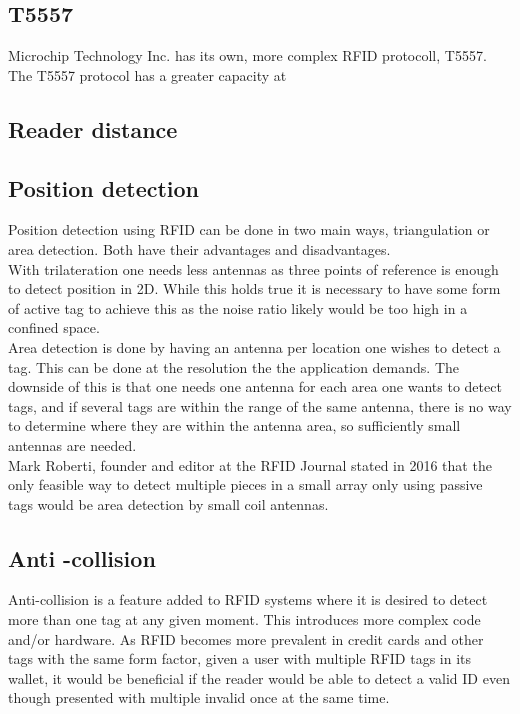 \subsection{T5557}
Microchip Technology Inc. has its own, more complex RFID protocoll, T5557. \cite{T5557priority} The T5557 protocol has a greater capacity at 

\subsection{Reader distance}
\cite{microID125}
\subsection{Position detection}
Position detection using RFID can be done in two main ways, triangulation \cite{triangulationbritannica_2011} or area detection. \cite{cho2014rfid} Both have their advantages and disadvantages.\\

With trilateration one needs less antennas as three points of reference is enough to detect position in 2D. While this holds true it is necessary to have some form of active tag to achieve this as the noise ratio likely would be too high in a confined space.\\

Area detection is done by having an antenna per location one wishes to detect a tag. This can be done at the resolution the the application demands. The downside of this is that one needs one antenna for each area one wants to detect tags, and if several tags are within the range of the same antenna, there is no way to determine where they are within the antenna area, so sufficiently small antennas are needed.\\

Mark Roberti, founder and editor at the RFID Journal stated in 2016 that the only feasible way to detect multiple pieces in a small array only using passive tags would be area detection by small coil antennas. \cite{roberti_francois}


\subsection{Anti -collision}

Anti-collision is a feature added to RFID systems where it is desired to detect more than one tag at any given moment. This introduces more complex code and/or hardware. As RFID becomes more prevalent in credit cards and other tags with the same form factor, given a user with multiple RFID tags in its wallet, it would be beneficial if the reader would be able to detect a valid ID even though presented with multiple invalid once at the same time.\\

